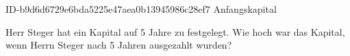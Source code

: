 \begin{exercise}
      {ID-b9d6d6729e6bda5225e47aea0b13945986c28ef7}
      {Anfangskapital}
  \ifproblem\problem\par
    Herr Steger hat ein Kapital auf \num{5} Jahre zu  festgelegt.
    Wie hoch war das Kapital, wenn Herrn Steger nach \num{5} Jahren 
    ausgezahlt wurden?
  \fi
\end{exercise}

